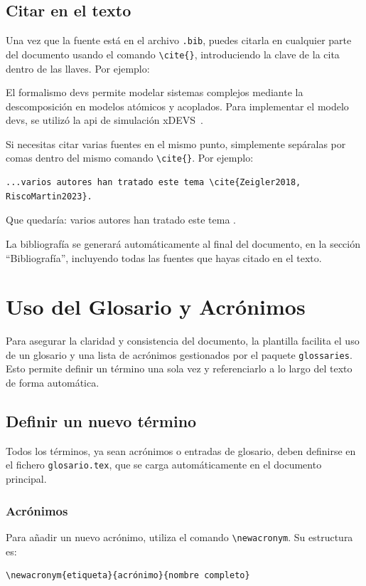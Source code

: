 \documentclass[11pt,a4paper]{book}
\begin{document}
\subsection{Citar en el texto}

Una vez que la fuente está en el archivo \texttt{.bib}, puedes citarla en cualquier parte del documento usando el comando \verb|\cite{}|, introduciendo la clave de la cita dentro de las llaves. Por ejemplo:

El formalismo \gls{devs} permite modelar sistemas complejos mediante la descomposición en modelos atómicos y acoplados. Para implementar el modelo \gls{devs}, se utilizó la \gls{api} de simulación xDEVS~\cite{RiscoMartin2023}.

Si necesitas citar varias fuentes en el mismo punto, simplemente sepáralas por comas dentro del mismo comando \verb|\cite{}|. Por ejemplo:
\begin{verbatim}
...varios autores han tratado este tema \cite{Zeigler2018, RiscoMartin2023}.
\end{verbatim}

Que quedaría: varios autores han tratado este tema \cite{Zeigler2018, RiscoMartin2023}.

La bibliografía se generará automáticamente al final del documento, en la sección ``Bibliografía'', incluyendo todas las fuentes que hayas citado en el texto.

\section{Uso del Glosario y Acrónimos}

Para asegurar la claridad y consistencia del documento, la plantilla facilita el uso de un glosario y una lista de acrónimos gestionados por el paquete \texttt{glossaries}. Esto permite definir un término una sola vez y referenciarlo a lo largo del texto de forma automática.

\subsection{Definir un nuevo término}

Todos los términos, ya sean acrónimos o entradas de glosario, deben definirse en el fichero \texttt{glosario.tex}, que se carga automáticamente en el documento principal.

\subsubsection{Acrónimos}
Para añadir un nuevo acrónimo, utiliza el comando \verb|\newacronym|. Su estructura es: 
\begin{verbatim}
\newacronym{etiqueta}{acrónimo}{nombre completo} 
\end{verbatim}
\end{document}
